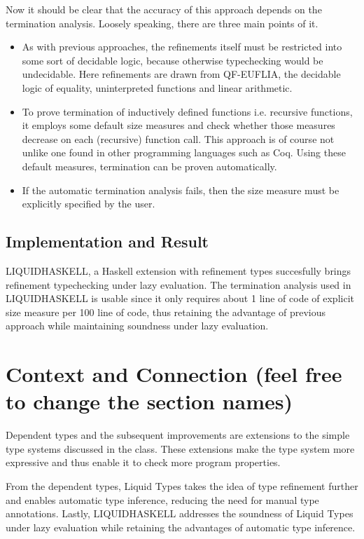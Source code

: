 \documentclass[a4paper,UKenglish]{lipics-v2016}
\begin{document}
      Now it should be clear that the accuracy of this approach depends on the
      termination analysis.  Loosely speaking, there are three main points of
      it.
      \begin{itemize}
        \item As with previous approaches, the refinements itself must be
          restricted into some sort of decidable logic, because otherwise
          typechecking would be undecidable.  Here refinements are drawn from
          QF-EUFLIA, the decidable logic of equality, uninterpreted
          functions and linear arithmetic.
        \item To prove termination of inductively defined functions i.e.
          recursive functions, it employs some default size measures and check
          whether those measures decrease on each (recursive) function call.
          This approach is of course not unlike one found in other programming
          languages such as Coq. Using these default measures, termination can
          be proven automatically.
        \item If the automatic termination analysis fails, then the size
          measure must be explicitly specified by the user.
      \end{itemize}

    \subsection{Implementation and Result}
      
      LIQUIDHASKELL, a Haskell extension with refinement types succesfully
      brings refinement typechecking under lazy evaluation.  The termination
      analysis used in LIQUIDHASKELL is usable since it only requires about 1
      line of code of explicit size measure per 100 line of code, thus
      retaining the advantage of previous approach while maintaining soundness
      under lazy evaluation.

\section{Context and Connection (feel free to change the section names)}

  Dependent types and the subsequent improvements are extensions to the simple
  type systems discussed in the class. These extensions make the type system
  more expressive and thus enable it to check more program properties.

  From the dependent types, Liquid Types takes the idea of type refinement
  further and enables automatic type inference, reducing the need for manual
  type annotations. Lastly, LIQUIDHASKELL addresses the soundness of Liquid
  Types under lazy evaluation while retaining the advantages of automatic type
  inference.
\end{document}
